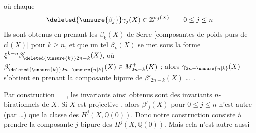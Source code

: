 où chaque
\[
\deleted{\unsure{\beta_{j}}}\gamma_{j}(X)\in\mathbb Z^{\sigma_j(X)}
\qquad 0\leq j\leq n
\]
Ils sont obtenus en prenant les $\beta_k(X)$ de Serre [composantes de poids purs de $\mathrm{cl}(X)$] pour $k\geq n$, et  que un tel $\beta_k(X)$ se met sous la forme $\xi^{k-n}\beta'_{\deleted{\unsure{k}}2n-k}(X)$, où $\beta'_{\deleted{\unsure{k}}2n-\unsure{n|k}}(X)\in M^+_{2n-k}(K)$ ; alors $\gamma_{2n-\unsure{n|k}}(X)$ s'obtient en prenant la composante \uline{bipure} de $\beta'_{2n-k}(X)$ \dots\ .

Par construction $=$, les invariants ainsi obtenus sont des invariants $n$-birationnels de $X$. Si $X$ est projective , alors $\beta'_j(X)$ pour $0\leq j\leq n$ n'est autre (par  \dots) que la classe des $H^j(X,\mathbb Q(0))$. Donc notre construction consiste à prendre la composante $j$-bipure des $H^j(X,\mathbb Q(0))$. Mais cela n'est autre aussi
